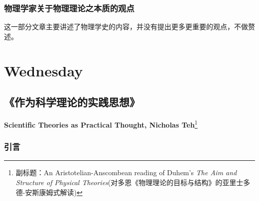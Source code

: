 \documentclass[12pt, a4paper, oneside]{ctexart}
\newcommand{\f}{\footnote}
\begin{document}
\subsubsection{物理学家关于物理理论之本质的观点}
这一部分文章主要讲述了物理学史的内容，并没有提出更多更重要的观点，不做赘述。

\section{Wednesday}
\subsection{《作为科学理论的实践思想》}
\textbf{Scientific Theories as Practical Thought, Nicholas Teh}\f{副标题：An Aristotelian-Anscombean reading of Duhem's \textit{The Aim and Structure of Physical Theories}(对多恩《物理理论的目标与结构》的亚里士多德-安斯康姆式解读)}

\subsubsection{引言}
\end{document}
